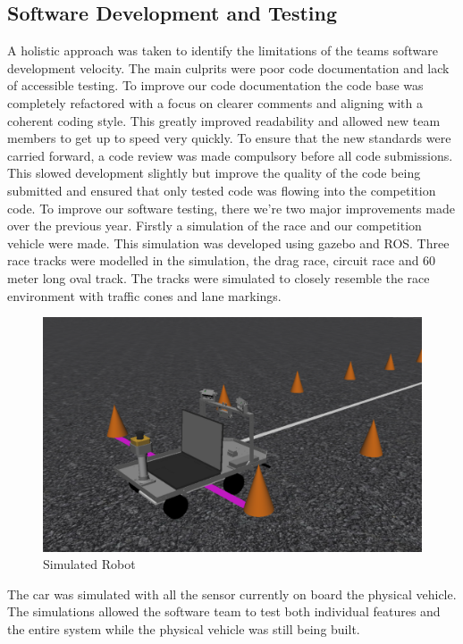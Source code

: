 \documentclass[11pt,journal]{IEEEtran}
\begin{document}
\subsection{Software Development and Testing}
A holistic approach was taken to identify the limitations of the teams software development velocity. The main culprits were poor code documentation and lack of accessible testing.
To improve our code documentation the code base was completely refactored with a focus on clearer comments and aligning with a coherent coding style. This greatly improved readability and allowed new team members to get up to speed very quickly. To ensure that the new standards were carried forward, a code review was made compulsory before all code submissions. This slowed development slightly but improve the quality of the code being submitted and ensured that only tested code was flowing into the competition code.
To improve our software testing, there we're two major improvements made over the previous year. Firstly a simulation of the race and our competition vehicle were made. This simulation was developed using gazebo and ROS. Three race tracks were modelled in the simulation, the drag race, circuit race and 60 meter long oval track. The tracks were simulated to closely resemble the race environment with traffic cones and lane markings.

\begin{figure}[ht]
\centerline{\includegraphics[width=0.9\columnwidth]{simulated_robot.png}}
\caption{Simulated Robot}
\label{Sim_Robot}
\end{figure}

The car was simulated with all the sensor currently on board the physical vehicle. The simulations allowed the software team to test both individual features and the entire system while the physical vehicle was still being built.
\end{document}
